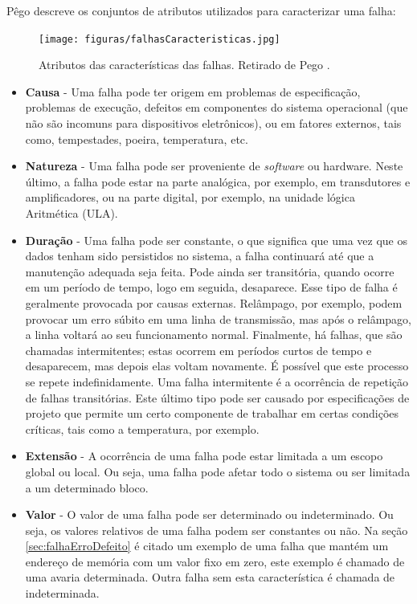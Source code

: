 \documentclass[a4paper,12pt,brazil]{ufms-cpcx}
\begin{document}
Pêgo \cite{Pego:2014} descreve os conjuntos de atributos utilizados para caracterizar uma falha:

\begin{figure}[H]
	\centering
	\texttt{[image: figuras/falhasCaracteristicas.jpg]}
	\caption{Atributos das características das falhas. Retirado de Pego \cite{Pego:2014}.}
	\label{Img:falhasCaracteristicas}	
\end{figure}

\begin{itemize}
	\item \textbf{Causa} - Uma falha pode ter origem em problemas de especificação, problemas de execução, defeitos em componentes do sistema operacional (que não são incomuns para dispositivos eletrônicos), ou em fatores externos, tais como, tempestades, poeira, temperatura, etc.
	
	\item \textbf{Natureza} - Uma falha pode ser proveniente de \textit{software} ou hardware. Neste último, a falha pode estar na parte analógica, por exemplo, em transdutores e amplificadores, ou na parte digital, por exemplo, na unidade lógica Aritmética (ULA).
	
	\item \textbf{Duração} - Uma falha pode ser constante, o que significa que uma vez que os dados tenham sido persistidos no sistema, a falha continuará até que a manutenção adequada seja feita. Pode ainda ser transitória, quando ocorre em um período de tempo, logo em seguida, desaparece. Esse tipo de falha é geralmente provocada por causas externas. Relâmpago, por exemplo, podem provocar um erro súbito em uma linha de transmissão, mas após o relâmpago, a linha voltará ao seu funcionamento normal. Finalmente, há falhas, que são chamadas intermitentes; estas ocorrem em períodos curtos de tempo e desaparecem, mas depois elas voltam novamente. É possível que este processo se repete indefinidamente. Uma falha intermitente é a ocorrência de repetição de falhas transitórias. Este último tipo pode ser causado por especificações de projeto que permite um certo componente de trabalhar em certas condições críticas, tais como a temperatura, por exemplo.
	
	\item \textbf{Extensão} - A ocorrência de uma falha pode estar limitada a um escopo global ou local. Ou seja, uma falha pode afetar todo o sistema ou ser limitada a um determinado bloco. 
	
	\item \textbf{Valor} - O valor de uma falha pode ser determinado ou indeterminado. Ou seja, os valores relativos de uma falha podem ser constantes ou não. Na seção \ref{sec:falhaErroDefeito} é citado um exemplo de uma falha que mantém um endereço de memória com um valor fixo em zero, este exemplo é chamado de uma avaria determinada. Outra falha sem esta característica é chamada de indeterminada.
	
	             
	  
\end{itemize}
\end{document}
